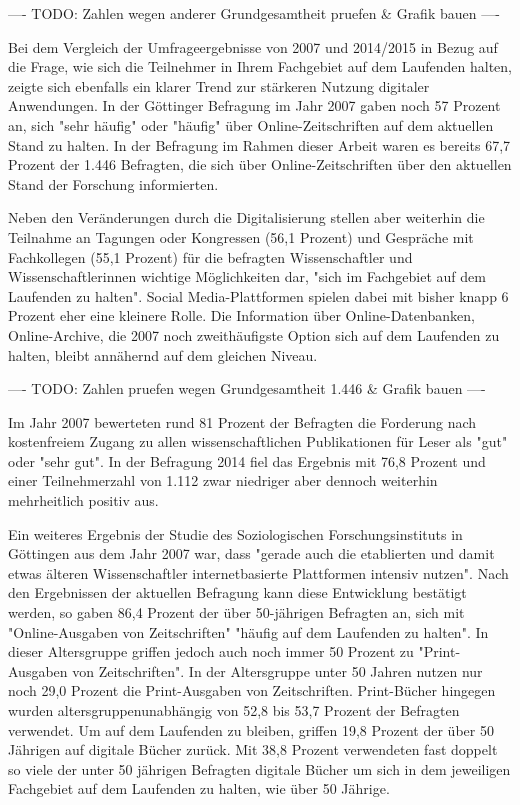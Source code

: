 ---- TODO: Zahlen wegen anderer Grundgesamtheit pruefen & Grafik bauen ----

Bei dem Vergleich der Umfrageergebnisse von 2007 und 2014/2015 in Bezug auf die Frage, wie sich die Teilnehmer in Ihrem Fachgebiet auf dem Laufenden halten, zeigte sich ebenfalls ein klarer Trend zur stärkeren Nutzung digitaler Anwendungen. In der Göttinger Befragung im Jahr 2007 gaben noch 57 Prozent an, sich "sehr häufig" oder "häufig" über Online-Zeitschriften auf dem aktuellen Stand zu halten. In der Befragung im Rahmen dieser Arbeit waren es bereits 67,7 Prozent der 1.446 Befragten, die sich über Online-Zeitschriften über den aktuellen Stand der Forschung informierten.

Neben den Veränderungen durch die Digitalisierung stellen aber weiterhin die Teilnahme an Tagungen oder Kongressen (56,1 Prozent) und Gespräche mit Fachkollegen (55,1 Prozent) für die befragten Wissenschaftler und Wissenschaftlerinnen wichtige Möglichkeiten dar, "sich im Fachgebiet auf dem Laufenden zu halten". Social Media-Plattformen spielen dabei mit bisher knapp 6 Prozent eher eine kleinere Rolle. Die Information über Online-Datenbanken, Online-Archive, die 2007 noch zweithäufigste Option sich auf dem Laufenden zu halten, bleibt annähernd auf dem gleichen Niveau.

---- TODO: Zahlen pruefen wegen Grundgesamtheit 1.446 & Grafik bauen ----

Im Jahr 2007 bewerteten rund 81 Prozent der Befragten die Forderung nach kostenfreiem Zugang zu allen wissenschaftlichen Publikationen für Leser als "gut" oder "sehr gut". In der Befragung 2014 fiel das Ergebnis mit 76,8 Prozent und einer Teilnehmerzahl von 1.112 zwar niedriger aber dennoch weiterhin mehrheitlich positiv aus.

Ein weiteres Ergebnis der Studie des Soziologischen Forschungsinstituts in Göttingen aus dem Jahr 2007 war, dass "gerade auch die etablierten und damit etwas älteren Wissenschaftler internetbasierte Plattformen intensiv nutzen". Nach den Ergebnissen der aktuellen Befragung kann diese Entwicklung bestätigt werden, so gaben 86,4 Prozent der über 50-jährigen Befragten an, sich mit "Online-Ausgaben von Zeitschriften" "häufig auf dem Laufenden zu halten". In dieser Altersgruppe griffen jedoch auch noch immer 50 Prozent zu "Print-Ausgaben von Zeitschriften". In der Altersgruppe unter 50 Jahren nutzen nur noch 29,0 Prozent die Print-Ausgaben von Zeitschriften. Print-Bücher hingegen wurden altersgruppenunabhängig von 52,8 bis 53,7 Prozent der Befragten verwendet. Um auf dem Laufenden zu bleiben, griffen 19,8 Prozent der über 50 Jährigen auf digitale Bücher zurück. Mit 38,8 Prozent verwendeten fast doppelt so viele der unter 50 jährigen Befragten digitale Bücher um sich in dem jeweiligen Fachgebiet auf dem Laufenden zu halten, wie über 50 Jährige.

